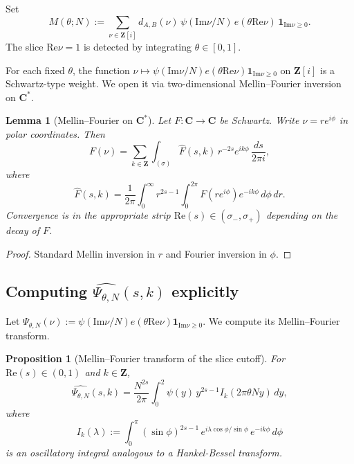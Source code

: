 \documentclass[11pt]{article}
\newtheorem{lemma}[theorem]{Lemma}
\newtheorem{proposition}[theorem]{Proposition}
\theoremstyle{definition}
\newcommand{\Z}{\mathbf{Z}}
\newcommand{\C}{\mathbf{C}}
\newcommand{\Zi}{\Z[i]}
\renewcommand{\Re}{\mathrm{Re}}
\renewcommand{\Im}{\mathrm{Im}}
\begin{document}
Set
\[
M(\theta;N):=\sum_{\nu\in\Zi}d_{A,B}(\nu)\,\psi(\Im\nu/N)\,e(\theta\Re\nu)\,\mathbf{1}_{\Im\nu\ge 0}.
\]
The slice $\Re\nu=1$ is detected by integrating $\theta\in[0,1]$.

For each fixed $\theta$, the function $\nu\mapsto\psi(\Im\nu/N)e(\theta\Re\nu)\mathbf{1}_{\Im\nu\ge 0}$ on $\Zi$ is a Schwartz-type weight. We open it via two-dimensional Mellin--Fourier inversion on $\C^*$.

\begin{lemma}[Mellin--Fourier on $\C^*$]\label{lem:mellin-fourier}
Let $F:\C\to\C$ be Schwartz. Write $\nu=re^{i\phi}$ in polar coordinates. Then
\[
F(\nu)=\sum_{k\in\Z}\int_{(\sigma)}\widehat F(s,k)\,r^{-2s}e^{ik\phi}\,\frac{ds}{2\pi i},
\]
where
\[
\widehat F(s,k)=\frac{1}{2\pi}\int_0^\infty r^{2s-1}\int_0^{2\pi}F(re^{i\phi})e^{-ik\phi}\,d\phi\,dr.
\]
Convergence is in the appropriate strip $\Re(s)\in(\sigma_-,\sigma_+)$ depending on the decay of $F$.
\end{lemma}

\begin{proof}
Standard Mellin inversion in $r$ and Fourier inversion in $\phi$.
\end{proof}

\subsection{Computing $\widehat{\Psi_{\theta,N}}(s,k)$ explicitly}

Let $\Psi_{\theta,N}(\nu):=\psi(\Im\nu/N)e(\theta\Re\nu)\mathbf{1}_{\Im\nu\ge 0}$. We compute its Mellin--Fourier transform.

\begin{proposition}[Mellin--Fourier transform of the slice cutoff]\label{prop:mellin-fourier-slice}
For $\Re(s)\in(0,1)$ and $k\in\Z$,
\[
\widehat{\Psi_{\theta,N}}(s,k)=\frac{N^{2s}}{2\pi}\int_0^2\psi(y)\,y^{2s-1}I_k(2\pi\theta Ny)\,dy,
\]
where
\[
I_k(\lambda):=\int_0^\pi(\sin\phi)^{2s-1}\,e^{i\lambda\cos\phi/\sin\phi}\,e^{-ik\phi}\,d\phi
\]
is an oscillatory integral analogous to a Hankel-Bessel transform.
\end{proposition}
\end{document}
